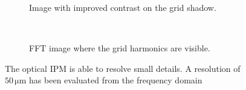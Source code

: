 \begin{figure}[!ht]
  \begin{subfigure}[t]{0.5\textwidth}
    
    \caption{Image with improved contrast on the grid shadow.}
    \label{chap4:grid_res_a}
  \end{subfigure}
  ~
  \begin{subfigure}[t]{0.5\textwidth}
    
    \caption{FFT image where the grid harmonics are visible.}
    \label{chap4:grid_res_b}
  \end{subfigure}
  \caption[The optical IPM is able to resolve small details.]{The optical IPM is able to resolve small details. A resolution of $50\,\mathrm{\mu m}$ has been evaluated from the frequency domain}
  \label{chap4:grid_res}
\end{figure}
